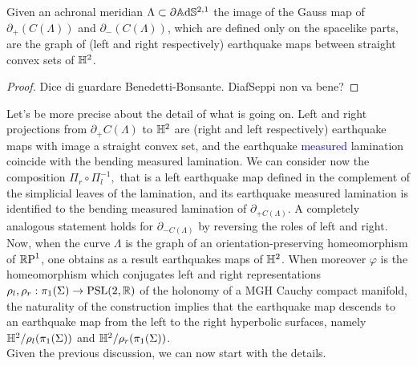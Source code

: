 \begin{lemma}
    Given an achronal meridian $\Lambda\subset\partial\A^{2,1}$ the image of the Gauss map of $\partial_+(C(\Lambda))$ and $\partial_-(C(\Lambda))$, which are defined only on the spacelike parts, are the graph of (left and right respectively) earthquake maps between straight convex sets of $\H^2$.
\end{lemma}
\begin{proof}
    Dice di guardare Benedetti-Bonsante. DiafSeppi non va bene?
\end{proof}

Let's be more precise about the detail of what is going on. Left and right projections from $\partial_+C(\Lambda)$ to $\H^2$ are (right and left respectively) earthquake maps with image a straight convex set, and the earthquake \textcolor{blue}{measured} lamination coincide with the bending measured lamination. We can consider now the composition $\Pi_r\circ\Pi_l^{-1},$ that is a left earthquake map defined in the complement of the simplicial leaves of the lamination, and its earthquake measured lamination is identified to the bending measured lamination of $\partial_{+C(\Lambda)}$. A completely analogous statement holds for $\partial_{-C(\Lambda)}$ by reversing the roles of left and right.\\  
Now, when the curve $\Lambda$ is the graph of an orientation-preserving homeomorphism of $\S$, one obtains as a result earthquakes maps of $\H^2$. When moreover $\varphi$ is the homeomorphism which conjugates left and right representations $\rho_l,\rho_r:\pi_1(\Sigma)\to\PSL$ of the holonomy of a MGH Cauchy compact manifold, the naturality of the construction implies that the earthquake map descends to an earthquake map from the left to the right hyperbolic surfaces, namely $\H^2/\rho_l(\pi_1(\Sigma))$ and $\H^2/\rho_r(\pi_1(\Sigma))$.\\
Given the previous discussion, we can now start with the details.



